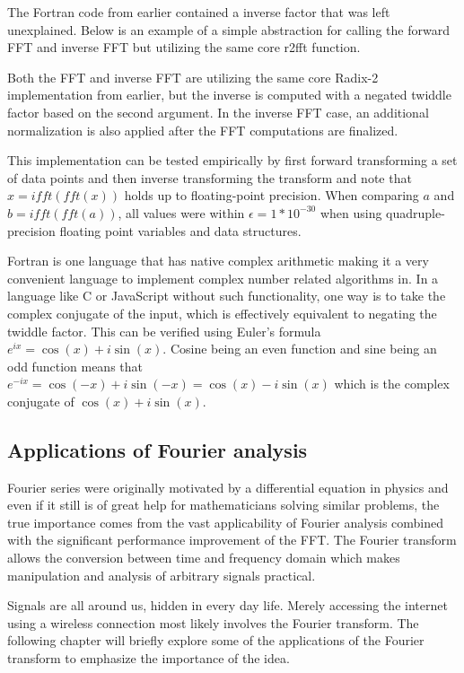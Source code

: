 The Fortran code from earlier contained a inverse factor that was left unexplained. Below is an example of a simple abstraction for calling the forward FFT and inverse FFT but utilizing the same core r2fft function.



Both the FFT and inverse FFT are utilizing the same core Radix-2 implementation from earlier, but the inverse is computed with a negated twiddle factor based on the second argument. In the inverse FFT case, an additional normalization is also applied after the FFT computations are finalized.

This implementation can be tested empirically by first forward transforming a set of data points and then inverse transforming the transform and note that $x = ifft(fft(x))$ holds up to floating-point precision. When comparing $a$ and $b = ifft(fft(a))$, all values were within $\epsilon = 1*10^{-30}$ when using quadruple-precision floating point variables and data structures.

Fortran is one language that has native complex arithmetic making it a very convenient language to implement complex number related algorithms in. In a language like C or JavaScript without such functionality, one way is to take the complex conjugate of the input, which is effectively equivalent to negating the twiddle factor. This can be verified using Euler's formula $e^{ix} = \cos(x) + i\sin(x)$. Cosine being an even function and sine being an odd function means that $e^{-ix} = \cos(-x) + i\sin(-x) = \cos(x) - i\sin(x)$ which is the complex conjugate of $\cos(x) + i\sin(x)$. 

\subsection{Applications of Fourier analysis}
Fourier series were originally motivated by a differential equation in physics and even if it still is of great help for mathematicians solving similar problems, the true importance comes from the vast applicability of Fourier analysis combined with the significant performance improvement of the FFT. The Fourier transform allows the conversion between time and frequency domain which makes manipulation and analysis of arbitrary signals practical. 

Signals are all around us, hidden in every day life. Merely accessing the internet using a wireless connection most likely involves the Fourier transform. The following chapter will briefly explore some of the applications of the Fourier transform to emphasize the importance of the idea. 

